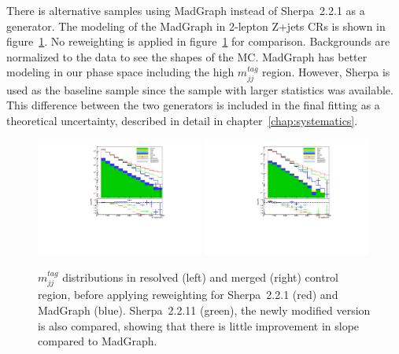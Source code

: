 There is alternative samples using MadGraph instead of Sherpa~2.2.1 as a generator. 
The modeling of the MadGraph in 2-lepton Z+jets CRs is shown in figure~\ref{fig:SherpaMadGraph}. 
No reweighting is applied in figure~\ref{fig:SherpaMadGraph} for comparison. 
Backgrounds are normalized to the data to see the shapes of the MC. 
MadGraph has better modeling in our phase space including the high $m^{tag}_{jj}$ region. 
However, Sherpa is used as the baseline sample since the sample with larger statistics was available.
This difference between the two generators is included in the final fitting as a theoretical uncertainty, described in detail in chapter~\ref{chap:systematics}.
\begin{figure}[ht]
    \centering
    \includegraphics[width=0.49\textwidth]{figures/2lep/reweighting/MTagResJets_0ptag2pjet_0ptv_CRVjet_ratio.pdf}
    \includegraphics[width=0.49\textwidth]{figures/2lep/reweighting/MTagMerJets_0ptag1pfat0pjet_0ptv_CRVjet_ratio.pdf}
    \caption{ $m^{tag}_{jj}$ distributions in resolved (left) and merged (right) control region, before applying reweighting for Sherpa~2.2.1 (red) and MadGraph (blue). Sherpa~2.2.11 (green), the newly modified version is also compared, showing that there is little improvement in slope compared to MadGraph.}
    \label{fig:SherpaMadGraph}
\end{figure}


